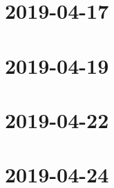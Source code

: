 \documentclass{ccg-notes}
\author{Colton Grainger}
\date{\today}
\begin{document}
\frontstuff

\section{2019-04-17}
    

\section{2019-04-19}
    

\section{2019-04-22}
    

\section{2019-04-24}
    
\end{document}
